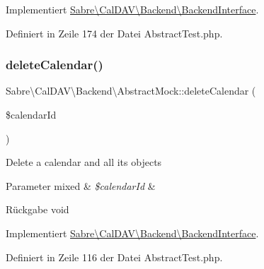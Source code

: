 Implementiert \mbox{\hyperlink{interface_sabre_1_1_cal_d_a_v_1_1_backend_1_1_backend_interface_a338ac93ff39e5ed7a9330df875b9efa4}{Sabre\textbackslash{}\+Cal\+D\+A\+V\textbackslash{}\+Backend\textbackslash{}\+Backend\+Interface}}.



Definiert in Zeile 174 der Datei Abstract\+Test.\+php.

\mbox{\label{class_sabre_1_1_cal_d_a_v_1_1_backend_1_1_abstract_mock_aedd71ef0fb853eb8159e273ecc90f909}} 
\subsubsection{\texorpdfstring{delete\+Calendar()}{deleteCalendar()}}
{\footnotesize\ttfamily Sabre\textbackslash{}\+Cal\+D\+A\+V\textbackslash{}\+Backend\textbackslash{}\+Abstract\+Mock\+::delete\+Calendar (\begin{DoxyParamCaption}\item[{}]{\$calendar\+Id }\end{DoxyParamCaption})}

Delete a calendar and all its objects


\begin{DoxyParams}[1]{Parameter}
mixed & {\em \$calendar\+Id} & \\
\hline
\end{DoxyParams}
\begin{DoxyReturn}{Rückgabe}
void 
\end{DoxyReturn}


Implementiert \mbox{\hyperlink{interface_sabre_1_1_cal_d_a_v_1_1_backend_1_1_backend_interface_a909fbc63f768c2bf8409416d3f24e898}{Sabre\textbackslash{}\+Cal\+D\+A\+V\textbackslash{}\+Backend\textbackslash{}\+Backend\+Interface}}.



Definiert in Zeile 116 der Datei Abstract\+Test.\+php.

\mbox{\label{class_sabre_1_1_cal_d_a_v_1_1_backend_1_1_abstract_mock_a899605a43f9aaba1742ab62ece53a66a}} 
